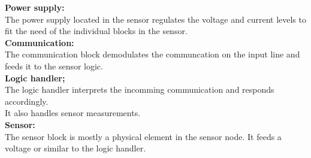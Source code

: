 \textbf{Power supply:}\\
The power supply located in the sensor regulates the voltage and current levels to fit the need of the individual blocks in the sensor.\\

\textbf{Communication:}\\
The communication block demodulates the communcation on the input line and feeds it to the sensor logic.\\

\textbf{Logic handler;}\\
The logic handler interprets the incomming communication and responds accordingly.\\
It also handles sensor measurements.\\

\textbf{Sensor:}\\
The sensor block is mostly a physical element in the sensor node. It feeds a voltage or similar to the logic handler.\\



